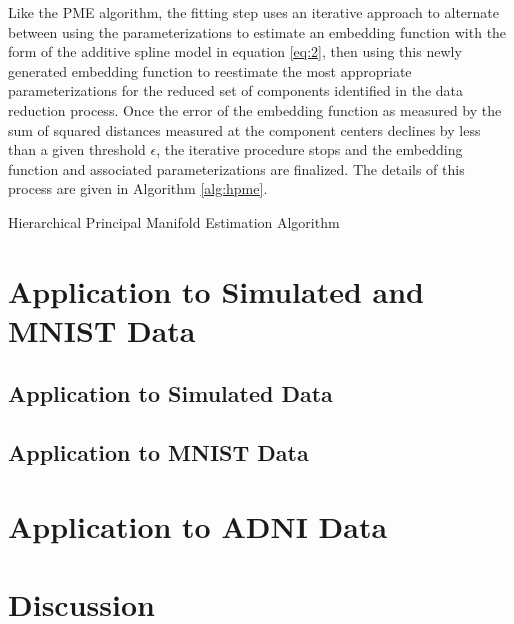 \documentclass[11pt,reqno]{article}
\theoremstyle{definition}
\begin{document}
Like the PME algorithm, the fitting step uses an iterative approach to alternate between using the parameterizations to estimate an embedding function with the form of the additive spline model in equation \ref{eq:2}, then using this newly generated embedding function to reestimate the most appropriate parameterizations for the reduced set of components identified in the data reduction process. Once the error of the embedding function as measured by the sum of squared distances measured at the component centers declines by less than a given threshold $\epsilon$, the iterative procedure stops and the embedding function and associated parameterizations are finalized. The details of this process are given in Algorithm \ref{alg:hpme}.

\begin{algorithm}
\caption{Hierarchical Principal Manifold Estimation Algorithm}\label{alg:hpme}
  
\end{algorithm}

\section{Application to Simulated and MNIST Data}

\subsection{Application to Simulated Data}

\subsection{Application to MNIST Data}

\section{Application to ADNI Data}

\section{Discussion}

\newpage

\nocite{*}
%
%
\printbibliography
\end{document}
